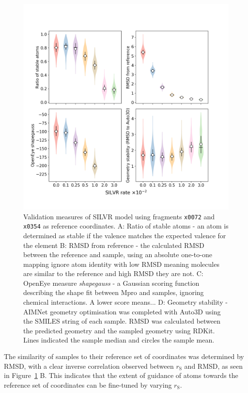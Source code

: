 \documentclass[journal=jacsat,manuscript=article]{achemso}
\begin{document}
\begin{figure}[htb!]
    \centering
    \includegraphics[width=\textwidth]{paper/Figures/Fig3/fig_3_metrics_violins.png}
    \caption{Validation measures of SILVR model using fragments \texttt{x0072} and \texttt{x0354} as reference coordinates. A: Ratio of stable atoms - an atom is determined as stable if the valence matches the expected valence for the element B: RMSD from reference - the calculated RMSD between the reference and sample, using an absolute one-to-one mapping ignore atom identity with low RMSD meaning molecules are similar to the reference and high RMSD they are not. C: OpenEye measure \textit{shapegauss} - a Gaussian scoring function describing the shape fit between Mpro and samples, ignoring chemical interactions. A lower score means... D: Geometry stability - AIMNet geometry optimisation was completed with Auto3D using the SMILES string of each sample. RMSD was calculated between the predicted geometry and the sampled geometry using RDKit. Lines indicated the sample median and circles the sample mean.}
    \label{fig:measures}
\end{figure}
The similarity of samples to their reference set of coordinates was determined by RMSD, with a clear inverse correlation observed between $r_{\mathrm{S}}$ and RMSD, as seen in Figure~\ref{fig:measures} B. This indicates that the extent of guidance of atoms towards the reference set of coordinates can be fine-tuned by varying $r_{\mathrm{S}}$. 
\end{document}
